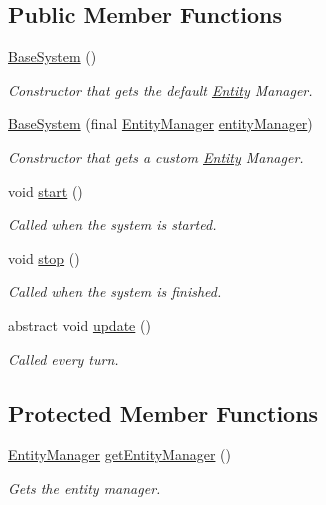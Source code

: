 \subsection*{Public Member Functions}
\begin{DoxyCompactItemize}
\item 
\hyperlink{classbr_1_1unb_1_1unbomber_1_1core_1_1_base_system_a3373f6355b3627429420a6ae0b0c82b0}{Base\+System} ()
\begin{DoxyCompactList}\small\item\em Constructor that gets the default \hyperlink{classbr_1_1unb_1_1unbomber_1_1core_1_1_entity}{Entity} Manager. \end{DoxyCompactList}\item 
\hyperlink{classbr_1_1unb_1_1unbomber_1_1core_1_1_base_system_a54aea8447c9a3acee334817156d760e5}{Base\+System} (final \hyperlink{interfacebr_1_1unb_1_1unbomber_1_1core_1_1_entity_manager}{Entity\+Manager} \hyperlink{classbr_1_1unb_1_1unbomber_1_1core_1_1_base_system_acb388352563da4567a9641f97b7931ca}{entity\+Manager})
\begin{DoxyCompactList}\small\item\em Constructor that gets a custom \hyperlink{classbr_1_1unb_1_1unbomber_1_1core_1_1_entity}{Entity} Manager. \end{DoxyCompactList}\item 
void \hyperlink{classbr_1_1unb_1_1unbomber_1_1core_1_1_base_system_a19843ad5c583d362fa500c50ef3feb4c}{start} ()
\begin{DoxyCompactList}\small\item\em Called when the system is started. \end{DoxyCompactList}\item 
void \hyperlink{classbr_1_1unb_1_1unbomber_1_1core_1_1_base_system_a533f73011ce9f039fa88d0bec6616696}{stop} ()
\begin{DoxyCompactList}\small\item\em Called when the system is finished. \end{DoxyCompactList}\item 
abstract void \hyperlink{classbr_1_1unb_1_1unbomber_1_1core_1_1_base_system_a0fe91fa7aa0e8108edfff8c2c76ae888}{update} ()
\begin{DoxyCompactList}\small\item\em Called every turn. \end{DoxyCompactList}\end{DoxyCompactItemize}
\subsection*{Protected Member Functions}
\begin{DoxyCompactItemize}
\item 
\hyperlink{interfacebr_1_1unb_1_1unbomber_1_1core_1_1_entity_manager}{Entity\+Manager} \hyperlink{classbr_1_1unb_1_1unbomber_1_1core_1_1_base_system_a3ca5dbfa98a5ae18469d2ef4fbc7de1c}{get\+Entity\+Manager} ()
\begin{DoxyCompactList}\small\item\em Gets the entity manager. \end{DoxyCompactList}\end{DoxyCompactItemize}
